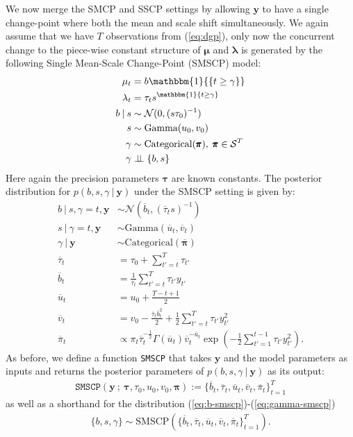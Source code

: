 We now merge the SMCP and SSCP settings by allowing $\mathbf{y}$ to have a single change-point where both the mean and scale shift simultaneously. We again assume that we have $T$ observations from (\ref{eq:dgp}), only now the concurrent change to the piece-wise constant structure of $\pmb{\mu}$ and $\pmb{\lambda}$ is generated by the following Single Mean-Scale Change-Point (SMSCP) model:
\begin{align}
    \label{eq:smscp-start}
    \mu_{t} &= b \mathbbm{1}{\{t \geq \gamma\}} \\
    \lambda_t &= \tau_t s^{\mathbbm{1}\{t\geq \gamma\}} \\
    b \:|\: s &\sim \mathcal{N}(0,(s \tau_0)^{-1}) \\
    s &\sim \text{Gamma}(u_0, v_0) \\
    \gamma &\sim \text{Categorical}(\pmb{\pi}),\;\pmb{\pi}\in \mathcal{S}^T \\
    \gamma &\indep \{b,s\} 
    \label{eq:smscp-end}
\end{align}
Here again the precision parameters $\pmb{\tau}$ are known constants. The posterior distribution for $p(b, s, \gamma \:|\: \mathbf{y})$ under the SMSCP setting is given by:
\begin{align}
    b \:|\: s, \gamma = t, \mathbf{y} &\sim \mathcal{N}(\overline{b}_t, (\overline{\tau}_t s)^{-1}) \label{eq:b-smscp} \\
    s \:|\: \gamma = t, \mathbf{y} &\sim \text{Gamma}(\overline{u}_t, \overline{v}_t) \\
    \gamma \:|\: \mathbf{y} &\sim \text{Categorical}(\overline{\pmb{\pi}}) \label{eq:gamma-smscp} \\
    \overline{\tau}_t &= \tau_0 + \sum_{t' = t}^{T} \tau_{t'}  \\
    \overline{b}_t &= \frac{1}{\overline{\tau}_t} \sum_{t'=t}^{T} \tau_{t'} y_{t'} \\
    \overline{u}_t &= u_0 + \frac{T - t + 1}{2} \\
    \overline{v}_t &= v_0 - \frac{\overline{\tau}_t\overline{b}^2_t}{2} + \frac{1}{2} \sum_{t'=t}^{T} \tau_{t'}y_{t'}^2 \\
    \overline{\pi}_t &\propto \pi_t\overline{\tau}_t^{-\frac{1}{2}} \Gamma(\overline{u}_t) \overline{v}_t^{-\overline{u}_t}\exp\left(- \frac{1}{2}\sum_{t'=1}^{t-1} \tau_{t'}y^2_{t'}\right).
\end{align}
As before, we define a function \texttt{SMSCP} that takes $\mathbf{y}$ and the model parameters as inputs and returns the posterior parameters of $p(b, s, \gamma\:|\:\mathbf{y})$ as its output:
\begin{align}
    \texttt{SMSCP}\left(\mathbf{y} \:;\: \pmb{\tau}, \tau_0, u_0, v_0, \pmb{\pi}\right) := \{\overline{b}_t, \overline{\tau}_t, \overline{u}_t, \overline{v}_t, \overline{\pi}_t\}_{t=1}^T
\end{align}
as well as a shorthand for the distribution (\ref{eq:b-smscp})-(\ref{eq:gamma-smscp})
\begin{align}
    \{b,s,\gamma\}\sim\text{SMSCP}(\{\overline{b}_t, \overline{\tau}_t, \overline{u}_t, \overline{v}_t, \overline{\pi}_t\}_{t=1}^T).
\end{align}

